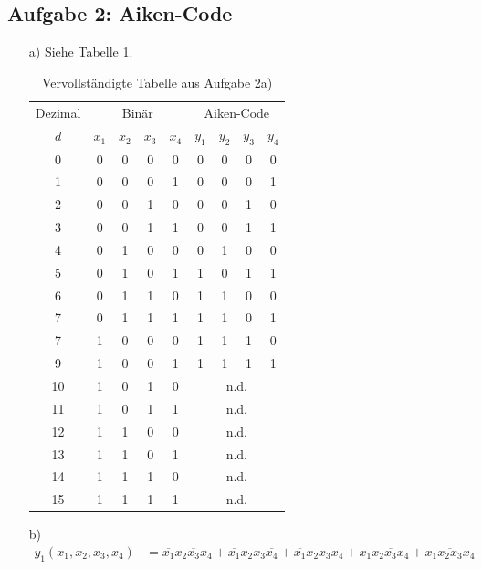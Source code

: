 \documentclass{article}
\begin{document}
	\subsection*{Aufgabe 2: Aiken-Code}
	\begin{enumerate}
		\item[a)] Siehe Tabelle \ref{t:aiken}.
		\begin{table}[b]
			\centering
			\begin{tabular}{c|cccc|cccc}
				Dezimal & \multicolumn{4}{c}{Binär} & \multicolumn{4}{|c}{Aiken-Code} \\
				$d$ & $x_1$ & $x_2$ & $x_3$ & $x_4$ & $y_1$ & $y_2$ & $y_3$ & $y_4$ \\ \hline
				0   & 0 & 0 & 0 & 0   & 0 & 0 & 0 & 0 \\
				1   & 0 & 0 & 0 & 1   & 0 & 0 & 0 & 1 \\
				2   & 0 & 0 & 1 & 0   & 0 & 0 & 1 & 0 \\
				3   & 0 & 0 & 1 & 1   & 0 & 0 & 1 & 1 \\
				4   & 0 & 1 & 0 & 0   & 0 & 1 & 0 & 0 \\
				5   & 0 & 1 & 0 & 1   & 1 & 0 & 1 & 1 \\
				6   & 0 & 1 & 1 & 0   & 1 & 1 & 0 & 0 \\
				7   & 0 & 1 & 1 & 1   & 1 & 1 & 0 & 1 \\
				7   & 1 & 0 & 0 & 0   & 1 & 1 & 1 & 0 \\
				9   & 1 & 0 & 0 & 1   & 1 & 1 & 1 & 1 \\
				10  & 1 & 0 & 1 & 0   & \multicolumn{4}{c}{n.d.} \\
				11  & 1 & 0 & 1 & 1   & \multicolumn{4}{c}{n.d.} \\
				12  & 1 & 1 & 0 & 0   & \multicolumn{4}{c}{n.d.} \\
				13  & 1 & 1 & 0 & 1   & \multicolumn{4}{c}{n.d.} \\
				14  & 1 & 1 & 1 & 0   & \multicolumn{4}{c}{n.d.} \\
				15  & 1 & 1 & 1 & 1   & \multicolumn{4}{c}{n.d.} \\
			\end{tabular}
			\caption{Vervollständigte Tabelle aus Aufgabe 2a)}
			\label{t:aiken}
		\end{table}
		\item[b)]
		\begin{align*}
			y_1(x_1,x_2,x_3,x_4) &= \overline{x_1} x_2 \overline{x_3} x_4 + \overline{x_1}x_2 x_3 \overline{x_4} + \overline{x_1} x_2 x_3 x_4 + x_1 \overline{x_2 x_3 x_4} + x_1 \overline{x_2 x_3} x_4 \\

\end{align*}
\end{enumerate}
\end{document}
